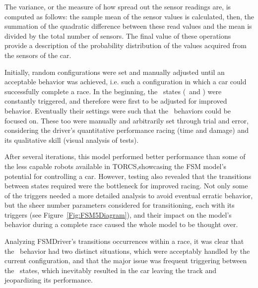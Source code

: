 The variance, or the measure of how spread out the sensor readings are, is computed as follows: the sample mean of the sensor values is calculated, then, the summation of the quadratic difference between these read values and the mean is divided by the total number of sensors. The final value of these operations provide a description of the probability distribution of the values acquired from the sensors of the car.
%
%

Initially, random configurations were set and manually adjusted until an acceptable behavior was achieved, i.e. such a configuration in which a car could successfully complete a race. In the beginning, the \recovery~states (\OT~and \St) were constantly triggered, and therefore were first to be adjusted for improved behavior. Eventually their settings were such that the \racing~behaviors could be focused on. These too were manually and arbitrarily set through trial and error, considering the driver's quantitative performance racing (time and damage) and its qualitative skill (visual analysis of tests).

After several iterations, this model performed better performance than some of the less capable robots available in TORCS,showcasing the FSM model's potential for controlling a car. However, testing also revealed that the transitions between states required were the bottleneck for improved racing. Not only some of the triggers needed a more detailed analysis to avoid eventual erratic behavior, but the sheer number parameters considered for transitioning, each with its triggers (see Figure~\ref{Fig:FSM5Diagram}), and their impact on the model's behavior during a complete race caused the whole model to be thought over.

Analyzing FSMDriver's transitions occurrences within a race, it was clear that the \recovery~behavior had two distinct situations, which were acceptably handled by the current configuration, and that the major issue was frequent triggering between the \racing~states, which inevitably resulted in the car leaving the track and jeopardizing its performance.

